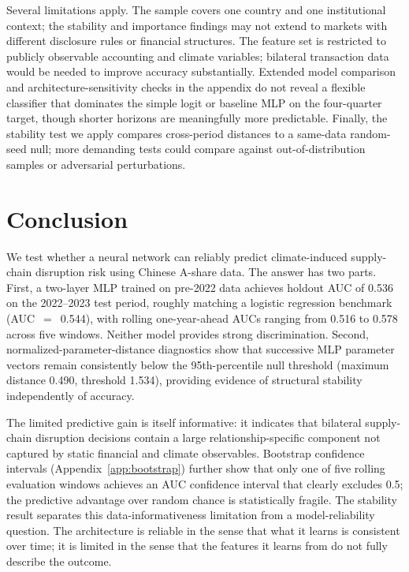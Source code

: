 \documentclass[12pt]{article}
\begin{document}
Several limitations apply.  The sample covers one country and one
institutional context; the stability and importance findings may not extend
to markets with different disclosure rules or financial structures.  The
feature set is restricted to publicly observable accounting and climate
variables; bilateral transaction data would be needed to improve accuracy
substantially.  Extended model comparison and architecture-sensitivity checks
in the appendix do not reveal a flexible classifier that dominates the simple
logit or baseline MLP on the four-quarter target, though shorter horizons are
meaningfully more predictable.  Finally, the stability test we
apply compares cross-period distances to a same-data random-seed null; more
demanding tests could compare against out-of-distribution samples or
adversarial perturbations.

\section{Conclusion}\label{sec:conclusion}

We test whether a neural network can reliably predict climate-induced
supply-chain disruption risk using Chinese A-share data.  The answer has two
parts.  First, a two-layer MLP trained on pre-2022 data achieves holdout
AUC of 0.536 on the 2022--2023 test period, roughly matching a logistic
regression benchmark (AUC~$=$~0.544), with rolling one-year-ahead AUCs
ranging from 0.516 to 0.578 across five windows.  Neither model provides
strong discrimination.  Second, normalized-parameter-distance diagnostics
show that successive MLP parameter vectors remain consistently below the
95th-percentile null threshold (maximum distance 0.490, threshold 1.534),
providing evidence of structural stability independently of accuracy.

The limited predictive gain is itself informative: it indicates that
bilateral supply-chain disruption decisions contain a large
relationship-specific component not captured by static financial and
climate observables.  Bootstrap confidence intervals (Appendix~\ref{app:bootstrap})
further show that only one of five rolling evaluation windows achieves an
AUC confidence interval that clearly excludes 0.5; the predictive advantage
over random chance is statistically fragile.  The stability result separates
this data-informativeness limitation from a model-reliability question.  The
architecture is reliable in the sense that what it learns is consistent over
time; it is limited in the sense that the features it learns from do not
fully describe the outcome.
\end{document}
